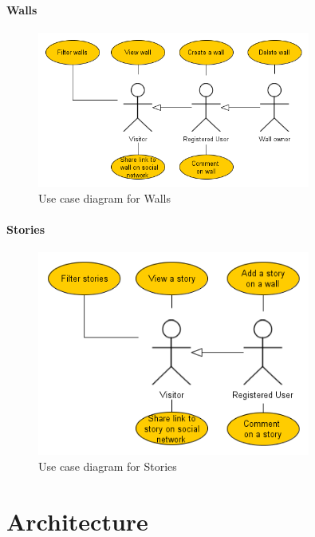 \documentclass[11pt]{book}
\begin{document}
\subsubsection{Walls}
\begin{figure}[H]
      \centering
      \includegraphics[width=0.8\textwidth]{Figures/Requirements/walls.png} %
      \caption{Use case diagram for Walls}
      \label{fig:req_usecase_walls}
\end{figure}

\subsubsection{Stories}
\begin{figure}[H]
      \centering
      \includegraphics[width=0.8\textwidth]{Figures/Requirements/stories.png} %
      \caption{Use case diagram for Stories}
      \label{fig:req_usecase_stories}
\end{figure}


\chapter{Architecture}\label{chap:architecture}
\end{document}
